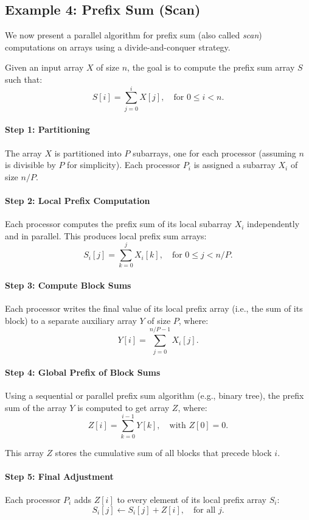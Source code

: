 \documentclass[12pt]{book}
\begin{document}
\subsection{Example 4: Prefix Sum (Scan)}

We now present a parallel algorithm for prefix sum (also called \textit{scan}) computations on arrays using a divide-and-conquer strategy.

Given an input array $X$ of size $n$, the goal is to compute the prefix sum array $S$ such that:
\[
S[i] = \sum_{j=0}^{i} X[j], \quad \text{for } 0 \leq i < n.
\]

\paragraph{Step 1: Partitioning}
The array $X$ is partitioned into $P$ subarrays, one for each processor (assuming $n$ is divisible by $P$ for simplicity). Each processor $P_i$ is assigned a subarray $X_i$ of size $n/P$.

\paragraph{Step 2: Local Prefix Computation}
Each processor computes the prefix sum of its local subarray $X_i$ independently and in parallel. This produces local prefix sum arrays:
\[
S_i[j] = \sum_{k=0}^{j} X_i[k], \quad \text{for } 0 \leq j < n/P.
\]

\paragraph{Step 3: Compute Block Sums}
Each processor writes the final value of its local prefix array (i.e., the sum of its block) to a separate auxiliary array $Y$ of size $P$, where:
\[
Y[i] = \sum_{j=0}^{n/P - 1} X_i[j].
\]

\paragraph{Step 4: Global Prefix of Block Sums}
Using a sequential or parallel prefix sum algorithm (e.g., binary tree), the prefix sum of the array $Y$ is computed to get array $Z$, where:
\[
Z[i] = \sum_{k=0}^{i-1} Y[k], \quad \text{with } Z[0] = 0.
\]

This array $Z$ stores the cumulative sum of all blocks that precede block $i$.

\paragraph{Step 5: Final Adjustment}
Each processor $P_i$ adds $Z[i]$ to every element of its local prefix array $S_i$:
\[
S_i[j] \gets S_i[j] + Z[i], \quad \text{for all } j.
\]
\end{document}
